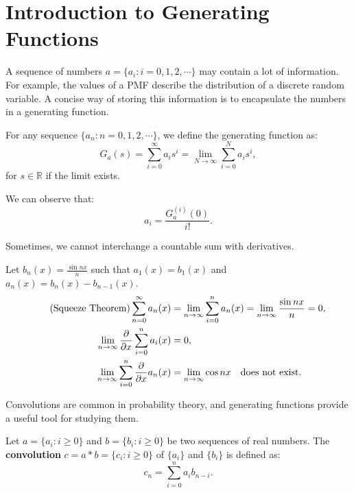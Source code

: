 \documentclass{huhtakm-template-book-v2}
\begin{document}
\section{Introduction to Generating Functions}
    A sequence of numbers $a = \{a_{i}:i = 0,1,2,\cdots\}$ may contain a lot of information. For example, the values of a PMF describe the distribution of a discrete random variable. A concise way of storing this information is to encapsulate the numbers in a generating function. 
    \begin{defn}
        For any sequence $\{a_{n}:n = 0,1,2,\cdots\}$, we define the generating function as:
        \begin{equation*}
            G_{a}(s) = \sum_{i = 0}^{\infty}a_{i}s^{i} = \lim_{N \to \infty}\sum_{i = 0}^{N}a_{i}s^{i},
        \end{equation*}
        for $s \in \mathbb{R}$ if the limit exists. 
    \end{defn}
    \begin{rem}
        We can observe that:
        \begin{equation*}
            a_{i} = \frac{G_{a}^{(i)}(0)}{i!}.
        \end{equation*}
    \end{rem}
    \begin{rem}
        Sometimes, we cannot interchange a countable sum with derivatives.
    \end{rem}
    \begin{eg}
        Let $b_{n}(x) = \frac{\sin{nx}}{n}$ such that $a_{1}(x) = b_{1}(x)$ and $a_{n}(x) = b_{n}(x)-b_{n-1}(x)$.
        \begin{align*}
            \tag{Squeeze Theorem}
            \sum_{n = 0}^{\infty}a_{n}(x) &= \lim_{n \to \infty}\sum_{i = 0}^{n}a_{n}(x) = \lim_{n \to \infty}\frac{\sin{nx}}{n} = 0,\\
            \lim_{n \to \infty}\pdv*{\sum_{i = 0}^{n}a_{i}(x)}{x} &= 0,\\
            \lim_{n \to \infty}\sum_{i = 0}^{n}\pdv*{a_{n}(x)}{x} &= \lim_{n \to \infty}\cos{nx}\quad \text{does not exist}.
        \end{align*}
    \end{eg}
    Convolutions are common in probability theory, and generating functions provide a useful tool for studying them.
    \begin{defn}
        Let $a = \{a_{i}:i \geq 0\}$ and $b = \{b_{i}:i \geq 0\}$ be two sequences of real numbers. The \textbf{convolution} $c = a*b = \{c_{i}:i \geq 0\}$ of $\{a_{i}\}$ and $\{b_{i}\}$ is defined as:
        \begin{equation*}
            c_{n} = \sum_{i = 0}^{n}a_{i}b_{n-i}.
        \end{equation*}
    \end{defn}
\end{document}
